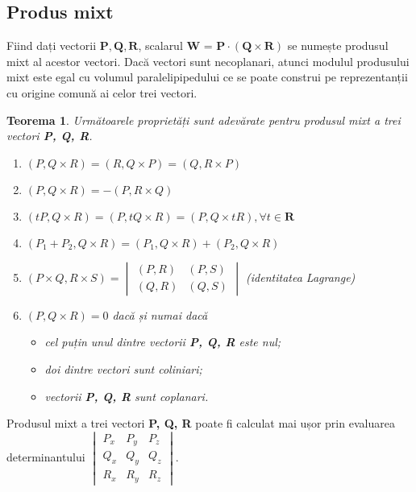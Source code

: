 \subsection{Produs mixt}
\label{ch1:sec_vectors:sub_mixed_product}
\indent

Fiind dați vectorii $\mathbf{P, Q, R}$, scalarul \textbf{W} = $\mathbf{P
\cdot (Q \times R)}$ se numește produsul mixt al acestor vectori. Dacă vectori
sunt necoplanari, atunci modulul produsului mixt este egal cu volumul
paralelipipedului ce se poate construi pe reprezentanții cu origine comună ai
celor trei vectori.

\newtheorem{mixed_product}[vector_arith]{Teorema}
\begin{mixed_product}
Următoarele proprietăți sunt adevărate pentru produsul mixt a trei vectori
\textbf{P, Q, R}.
\begin{enumerate}
  \item $(P, Q \times R) = (R, Q \times P) = (Q, R \times P)$
  \item $(P, Q \times R) = -(P, R \times Q)$
  \item $(tP, Q \times R) = (P, tQ \times R) = (P, Q \times tR), \forall t \in
  \mathbf{R}$
  \item $(P_1 + P_2, Q \times R) = (P_1, Q \times R) + (P_2, Q \times R)$
  \item $(P \times Q, R \times S) =
  \begin{vmatrix}
  (P, R) & (P, S) \\
  (Q, R) & (Q, S)
  \end{vmatrix} 
  $ (identitatea Lagrange)
  \item $(P, Q \times R) = 0$ dacă și numai dacă
  \begin{itemize}
    \item[(i)] cel puțin unul dintre vectorii \textbf{P, Q, R} este nul;
    \item[(ii)] doi dintre vectori sunt coliniari;
    \item[(iii)] vectorii \textbf{P, Q, R} sunt coplanari. 
  \end{itemize}
\end{enumerate}
\end{mixed_product}

Produsul mixt a trei vectori \textbf{P, Q, R} poate fi calculat mai ușor prin
evaluarea determinantului 
$
\begin{vmatrix}
P_x & P_y & P_z \\
Q_x & Q_y & Q_z \\
R_x & R_y & R_z
\end{vmatrix}
$.

